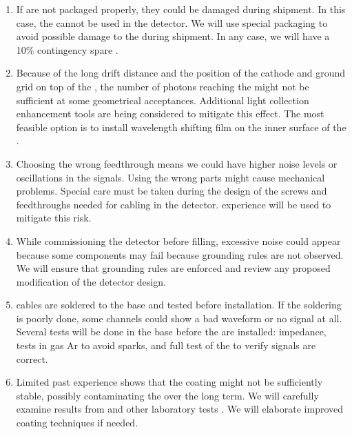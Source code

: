 \begin{enumerate}
\item If  are not packaged properly, they could be damaged during shipment. In this case, the  cannot be used in the detector. We will use special packaging to avoid possible damage to the  during shipment. In any case, we will have a \num{10}\% contingency spare .

\item Because of the long drift distance and the position of the cathode and ground grid on top of the , the number of photons reaching the  might not be sufficient at some geometrical acceptances. Additional light collection enhancement tools are being considered to mitigate this effect. The most feasible option is to install wavelength shifting film on the inner surface of the .

\item Choosing the wrong feedthrough means we could have higher noise levels or oscillations in the signals. Using the wrong parts might cause mechanical problems. Special care must be taken during the design of the screws and  feedthroughs needed for cabling in the detector.  experience will be used to mitigate this risk.

\item While commissioning  the detector before  filling, excessive noise could appear because some components may fail because grounding rules are not observed. We will ensure that grounding rules are enforced and review any proposed modification of the detector design.

\item {} cables are soldered to the  base and tested before installation. If the soldering is poorly done, some channels could show a bad waveform or no signal at all. Several tests will be done in the base before the  are installed: impedance,  tests in gas Ar to avoid sparks, and full test of the  to verify signals are correct.

\item Limited past experience shows that the  coating might not be sufficiently stable, possibly contaminating the  over the long term. We will carefully examine results from  and other laboratory tests%
. We will elaborate improved coating techniques if needed.

\end{enumerate}